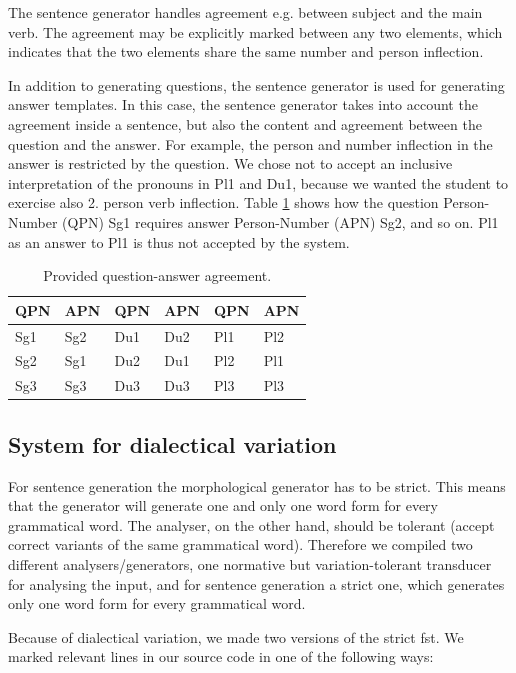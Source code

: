 \documentclass[11pt]{article}
\begin{document}
The sentence generator handles agreement e.g. between subject and the main verb. The agreement may be explicitly marked between any two elements, which indicates that the two elements share the same number and person inflection.

In addition to generating questions, the sentence generator is used for generating answer templates. In this case, the sentence generator takes into account the agreement inside a sentence, but also the content and agreement between the question and the answer. For example, the person and number inflection in the answer is restricted by the question. We chose not to accept an inclusive interpretation of the pronouns in Pl1 and Du1, because we wanted the student to exercise also 2. person verb inflection. Table \ref{QA} shows how the question Person-Number (QPN) Sg1 requires answer Person-Number (APN) Sg2, and so on. Pl1 as an answer to Pl1 is thus not accepted by the system.\\


\begin{table}[htdp]
\caption{Provided question-answer agreement.}
\begin{center}
\begin{tabular}[t]{ll|ll|ll}
QPN &APN &QPN &APN &QPN &APN \\
\hline
Sg1 &Sg2 &Du1 &Du2 &Pl1 &Pl2 \\
Sg2 &Sg1 &Du2 &Du1 &Pl2 &Pl1 \\
Sg3 &Sg3 &Du3 &Du3 &Pl3 &Pl3 \\
\hline
\end{tabular}
\end{center}
\label{QA}
\end{table}

\subsection{System for dialectical variation}\label{dialect}
For sentence generation the morphological generator has to be strict. This means that the generator will generate one and only one word form for every grammatical word. The analyser, on the other hand, should be tolerant (accept correct variants of the same grammatical word). Therefore we compiled two different analysers/generators, one normative but variation-tolerant transducer for analysing the input, and for sentence generation a strict one, which generates only one word form for every grammatical word.

Because of dialectical variation, we made two versions of the strict fst. We marked relevant lines in our source code in one of the following ways:
\end{document}

